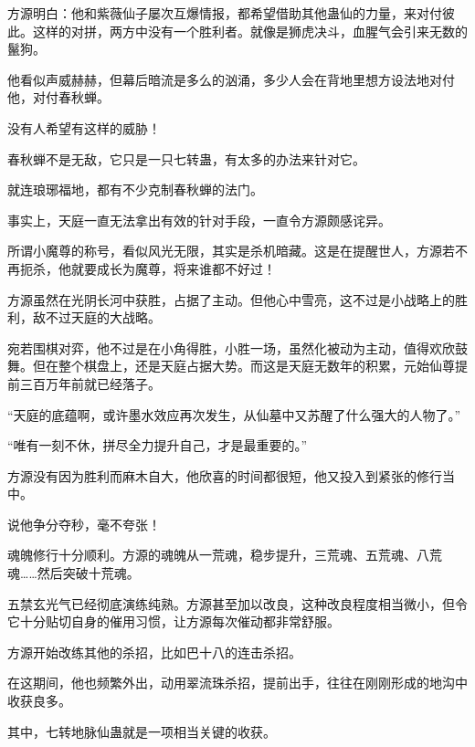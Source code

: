\begin{this_body}
方源明白：他和紫薇仙子屡次互爆情报，都希望借助其他蛊仙的力量，来对付彼此。这样的对拼，两方中没有一个胜利者。就像是狮虎决斗，血腥气会引来无数的鬣狗。

他看似声威赫赫，但幕后暗流是多么的汹涌，多少人会在背地里想方设法地对付他，对付春秋蝉。

没有人希望有这样的威胁！

春秋蝉不是无敌，它只是一只七转蛊，有太多的办法来针对它。

就连琅琊福地，都有不少克制春秋蝉的法门。

事实上，天庭一直无法拿出有效的针对手段，一直令方源颇感诧异。

所谓小魔尊的称号，看似风光无限，其实是杀机暗藏。这是在提醒世人，方源若不再扼杀，他就要成长为魔尊，将来谁都不好过！

方源虽然在光阴长河中获胜，占据了主动。但他心中雪亮，这不过是小战略上的胜利，敌不过天庭的大战略。

宛若围棋对弈，他不过是在小角得胜，小胜一场，虽然化被动为主动，值得欢欣鼓舞。但在整个棋盘上，还是天庭占据大势。而这是天庭无数年的积累，元始仙尊提前三百万年前就已经落子。

“天庭的底蕴啊，或许墨水效应再次发生，从仙墓中又苏醒了什么强大的人物了。”

“唯有一刻不休，拼尽全力提升自己，才是最重要的。”

方源没有因为胜利而麻木自大，他欣喜的时间都很短，他又投入到紧张的修行当中。

说他争分夺秒，毫不夸张！

魂魄修行十分顺利。方源的魂魄从一荒魂，稳步提升，三荒魂、五荒魂、八荒魂……然后突破十荒魂。

五禁玄光气已经彻底演练纯熟。方源甚至加以改良，这种改良程度相当微小，但令它十分贴切自身的催用习惯，让方源每次催动都非常舒服。

方源开始改练其他的杀招，比如巴十八的连击杀招。

在这期间，他也频繁外出，动用翠流珠杀招，提前出手，往往在刚刚形成的地沟中收获良多。

其中，七转地脉仙蛊就是一项相当关键的收获。

\end{this_body}

